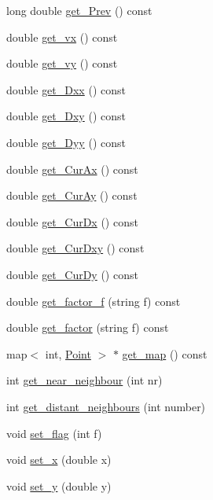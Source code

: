 \begin{DoxyCompactItemize}
long double \hyperlink{class_point_a7f61780c19bf584c97fcdb432e2d6e08}{get\+\_\+\+Prev} () const 
\item 
double \hyperlink{class_point_ad0f0083a12b3ff699e7edcd7adc90c81}{get\+\_\+vx} () const 
\item 
double \hyperlink{class_point_a6ed9a9e001af8ca030c648c280a05c69}{get\+\_\+vy} () const 
\item 
double \hyperlink{class_point_aef2637aabdb8e7dae3b20e67dfdc6e7a}{get\+\_\+\+Dxx} () const 
\item 
double \hyperlink{class_point_ad5be3c0b4fd5f65bc00ab3787361329c}{get\+\_\+\+Dxy} () const 
\item 
double \hyperlink{class_point_a4b4279a85ad655a77d90831c805a59e6}{get\+\_\+\+Dyy} () const 
\item 
double \hyperlink{class_point_aecfeb69a6a1ec3001343e9734e2e9746}{get\+\_\+\+Cur\+Ax} () const 
\item 
double \hyperlink{class_point_a3fc8a4d0cba11093f4468a52f641c517}{get\+\_\+\+Cur\+Ay} () const 
\item 
double \hyperlink{class_point_af2fef2c2ec81c04fe713f381ca2b2998}{get\+\_\+\+Cur\+Dx} () const 
\item 
double \hyperlink{class_point_a6b98226c33a0e7ba2302c13e33e25ea5}{get\+\_\+\+Cur\+Dxy} () const 
\item 
double \hyperlink{class_point_ab32d6e369d8cfc8beeb1e8c20c2a26bd}{get\+\_\+\+Cur\+Dy} () const 
\item 
double \hyperlink{class_point_a392f5d75605bd50620e2051ee15bc771}{get\+\_\+factor\+\_\+f} (string f) const 
\item 
double \hyperlink{class_point_a0d5dc8de308faf6875fa36074d6fc0f0}{get\+\_\+factor} (string f) const 
\item 
map$<$ int, \hyperlink{class_point}{Point} $>$ $\ast$ \hyperlink{class_point_a762956127e312f695530da058488fa22}{get\+\_\+map} () const 
\item 
int \hyperlink{class_point_a1cb03d7d73b39c92b7e56240b9184955}{get\+\_\+near\+\_\+neighbour} (int nr)
\item 
int \hyperlink{class_point_a64866cd58b7216bc8cbebe6dc8b46df1}{get\+\_\+distant\+\_\+neighbours} (int number)
\item 
void \hyperlink{class_point_ac0be2a43c354fed97e018c2b8fbf63b4}{set\+\_\+flag} (int f)
\item 
void \hyperlink{class_point_adaaf2fe64c78448b3c8d6e121ae3bca0}{set\+\_\+x} (double x)
\item 
void \hyperlink{class_point_a44bf07535f5dd99991a274833462379b}{set\+\_\+y} (double y)

\end{DoxyCompactItemize}
